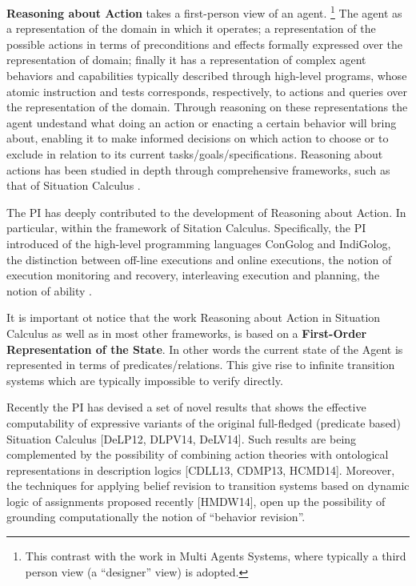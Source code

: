 \textbf{Reasoning about Action} takes a first-person view of an agent. %
\footnote{This contrast with the work in Multi Agents Systems, where
  typically a third person view (a ``designer'' view) is adopted.} %
The agent as a representation of the domain in which it operates;
a  representation of 
 the possible actions in terms of preconditions and effects formally expressed over the representation of domain;
finally it has a representation of  complex agent behaviors and capabilities typically  described through high-level programs, whose atomic instruction and tests corresponds, respectively, to actions and queries over the representation of the domain.
Through 
reasoning on these representations the agent undestand what doing an action or enacting a certain behavior will bring about, enabling it to make informed decisions on which action to choose or to exclude in relation to its current tasks/goals/specifications.
Reasoning about actions has been studied in depth through
comprehensive frameworks, such as that of Situation Calculus \cite{McHa69,Reiter01}.

The PI has deeply contributed to the development of Reasoning about
Action. In particular, within the framework of Sitation Calculus. Specifically, the PI
introduced of the high-level programming languages
ConGolog and IndiGolog, the
distinction between off-line executions and online executions, the
notion of execution monitoring and recovery, interleaving execution
and planning, the notion of ability \cite{DeGiacomoRS98,DeGiacomoLL00,SardinaGLL04,SardinaGLL06}.

It is important ot notice that the work Reasoning about Action in
Situation Calculus as well as in most other frameworks, is based on a
\textbf{First-Order Representation of the State}. In other words the
current state of the Agent is represented in terms of
predicates/relations.  This give rise to infinite transition systems
which are typically impossible to verify directly.

Recently the PI has devised a set of novel results
that shows the effective computability of expressive variants of the
original full-fledged (predicate based) Situation Calculus [DeLP12,
DLPV14, DeLV14]. Such results are being complemented by the
possibility of combining action theories with ontological
representations in description logics [CDLL13, CDMP13,
HCMD14]. Moreover, the techniques for applying belief revision to
transition systems based on dynamic logic of assignments proposed
recently [HMDW14], open up the possibility of grounding
computationally the notion of “behavior revision”.

